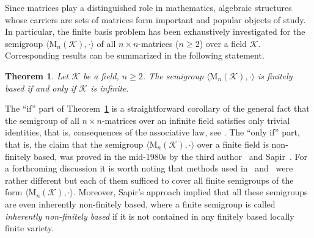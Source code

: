 \documentclass[11pt,reqno]{amsart}
\numberwithin{equation}{section}
\newtheorem{Thm}{Theorem}[section]
\theoremstyle{remark}
\begin{document}
Since matrices play a distinguished role in mathematics, algebraic structures whose carriers are sets of matrices form
important and popular objects of study. In particular, the finite basis problem has been exhaustively investigated for
the semigroup $\langle\mathrm{M}_n(\mathcal{K}),\cdot\rangle$ of all $n\times n$-matrices ($n\ge2$) over a field
$\mathcal{K}$. Corresponding results can be summarized in the following statement.
\begin{Thm}\label{Theorem 1.1}
Let $\mathcal{K}$ be a field, $n\ge2$. The semigroup $\langle\mathrm{M}_n(\mathcal{K}),\cdot\rangle$ is finitely based
if and only if $\mathcal{K}$ is infinite.
\end{Thm}
The ``if'' part of Theorem~\ref{Theorem 1.1} is a straightforward corollary of the general fact that the semigroup of
all $n\times n$-matrices over an infinite field satisfies only trivial identities, that is, consequences of the
associative law, see \cite[Lemma~2]{GoMi78}. The ``only if'' part, that is, the claim that the semigroup
$\langle\mathrm{M}_n(\mathcal{K}),\cdot\rangle$ over a finite field is non-finitely based, was proved in the mid-1980s
by the third author~\cite[Proposition~3]{V} and Sapir~\cite[Corollary 6.2]{sapirburnside}. For a forthcoming discussion
it is worth noting that methods used in~\cite{V} and~\cite{sapirburnside} were rather different but each of them
sufficed to cover all finite semigroups of the form $\langle\mathrm{M}_n(\mathcal{K}),\cdot\rangle$. Moreover, Sapir's
approach implied that all these semigroups are even inherently non-finitely based, where a finite semigroup is called
\emph{inherently non-finitely based} if it is not contained in any finitely based locally finite variety.
\end{document}
